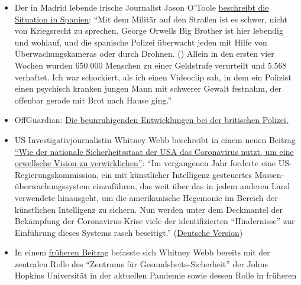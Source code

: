 \begin{itemize}
{  die Maßnahmen der Regierung Netanjahu}: ``Sie sprechen von einer
  exponentiellen Zunahme der Coronafälle, aber das einzige was
  exponentiell zunimmt, das sind die Menschen die aufstehen um unser
  Land und unsere Demokratie zu schützen.''
\item
  Der in Madrid lebende irische Journalist Jason O'Toole
  \href{https://www.rt.com/op-ed/486350-spain-tough-rules-covid-19-lockdown/}{beschreibt
  die Situation in Spanien}: ``Mit dem Militär auf den Straßen ist es
  schwer, nicht von Kriegsrecht zu sprechen. George Orwells Big Brother
  ist hier lebendig und wohlauf, und die spanische Polizei überwacht
  jeden mit Hilfe von Überwachungskameras oder durch Drohnen. () Allein
  in den ersten vier Wochen wurden 650.000 Menschen zu einer Geldstrafe
  verurteilt und 5.568 verhaftet. Ich war schockiert, als ich einen
  Videoclip sah, in dem ein Polizist einen psychisch kranken jungen Mann
  mit schwerer Gewalt festnahm, der offenbar gerade mit Brot nach Hause
  ging.''
\item
  OffGuardian:
  \href{https://off-guardian.org/2020/04/18/the-disturbing-developments-in-uk-policing/}{Die
  beunruhigenden Entwicklungen bei der britischen Polizei.}
\item
  US-Investigativjournalistin Whitney Webb beschreibt in einem neuen
  Beitrag
  \href{https://www.thelastamericanvagabond.com/top-news/techno-tyranny-how-us-national-security-state-using-coronavirus-fulfill-orwellian-vision/}{``Wie
  der nationale Sicherheitsstaat der USA das Coronavirus nutzt, um eine
  orwellsche Vision zu verwirklichen''}: ``Im vergangenen Jahr forderte
  eine US-Regierungs­­kommission, ein mit künstlicher Intelligenz
  gesteuertes Massen­über­wachungs­­system einzuführen, das weit über
  das in jedem anderen Land verwendete hinausgeht, um die amerikanische
  Hegemonie im Bereich der künstlichen Intelligenz zu sichern. Nun
  werden unter dem Deckmantel der Bekämpfung der Coronavirus-Krise viele
  der identifizierten ``Hindernisse'' zur Einführung dieses Systems
  rasch beseitigt.''
  (\href{https://www.konjunktion.info/2020/04/techno-tyrannei-wie-der-nationale-sicherheitsstaat-der-usa-den-coronavirus-einsetzt-um-eine-orwellsche-vision-zu-verwirklichen/}{Deutsche
  Version})
\item
  In einem
  \href{https://www.thelastamericanvagabond.com/top-news/all-roads-lead-dark-winter/}{früheren
  Beitrag} befasste sich Whitney Webb bereits mit der zentralen Rolle
  des ``Zentrums für Gesundsheits-Sicherheit'' der Johns Hopkins
  Universität in der aktuellen Pandemie sowie dessen Rolle in früheren

\end{itemize}
